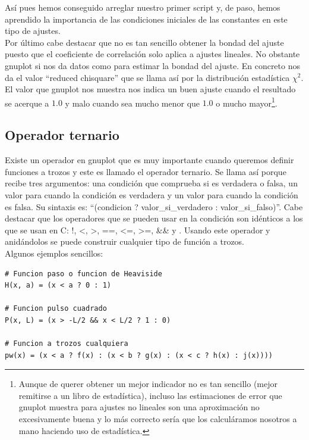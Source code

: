 \documentclass[11pt,a4paper,twoside,pdf]{article}
\numberwithin{equation}{section}
\begin{document}
Así pues hemos conseguido arreglar nuestro primer script y, de paso, hemos aprendido la importancia de las condiciones iniciales de las constantes en este tipo de ajustes.\\

Por último cabe destacar que no es tan sencillo obtener la bondad del ajuste puesto que el coeficiente de correlación solo aplica a ajustes lineales. No obstante gnuplot si nos da datos como para estimar la bondad del ajuste. En concreto nos da el valor ``reduced chisquare'' que se llama así por la distribución estadística $\chi^2$. El valor que gnuplot nos muestra nos indica un buen ajuste cuando el resultado se acerque a $1.0$ y malo cuando sea mucho menor que $1.0$ o mucho mayor\footnote{Aunque de querer obtener un mejor indicador no es tan sencillo (mejor remitirse a un libro de estadística), incluso las estimaciones de error que gnuplot muestra para ajustes no lineales son una aproximación no excesivamente buena y lo más correcto sería que los calculáramos nosotros a mano haciendo uso de estadística.}.

\subsection{Operador ternario}

Existe un operador en gnuplot que es muy importante cuando queremos definir funciones a trozos y este es llamado el operador ternario. Se llama así porque recibe tres argumentos: una condición que comprueba si es verdadera o falsa, un valor para cuando la condición es verdadera y un valor para cuando la condición es falsa. Su sintaxis es: ``(condicion ? valor\_si\_verdadero : valor\_si\_falso)''. Cabe destacar que los operadores que se pueden usar en la condición son idénticos a los que se usan en C: !, \textless , \textgreater , ==, \textless =, \textgreater =, \&\& y \textbar\textbar. Usando este operador y anidándolos se puede construir cualquier tipo de función a trozos. \\

Algunos ejemplos sencillos:

\begin{lstlisting}[language=Gnuplot]
# Funcion paso o funcion de Heaviside
H(x, a) = (x < a ? 0 : 1)

# Funcion pulso cuadrado
P(x, L) = (x > -L/2 && x < L/2 ? 1 : 0)

# Funcion a trozos cualquiera
pw(x) = (x < a ? f(x) : (x < b ? g(x) : (x < c ? h(x) : j(x))))
\end{lstlisting}
\end{document}

